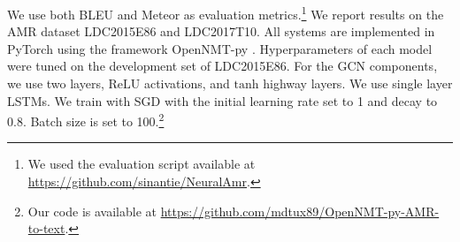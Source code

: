 \documentclass[11pt,a4paper]{article}
\begin{document}
We use both BLEU \cite{papineni2002bleu} and Meteor \cite{banerjee2005meteor} as evaluation metrics.\footnote{We used the evaluation script available at \url{https://github.com/sinantie/NeuralAmr}.} We report results on the AMR dataset LDC2015E86 and LDC2017T10.
All systems are implemented in PyTorch \cite{paszke2017automatic} using the framework OpenNMT-py \cite{opennmt}.
Hyperparameters of each model were tuned on the development set of LDC2015E86. For the GCN components, we use two layers, $\mathrm{ReLU}$ activations, and $\mathrm{tanh}$ highway layers. We use single layer LSTMs. We train with SGD with the initial learning rate set to 1 and decay to 0.8. Batch size is set to 100.\footnote{Our code is available at \url{https://github.com/mdtux89/OpenNMT-py-AMR-to-text}.} 
\end{document}

